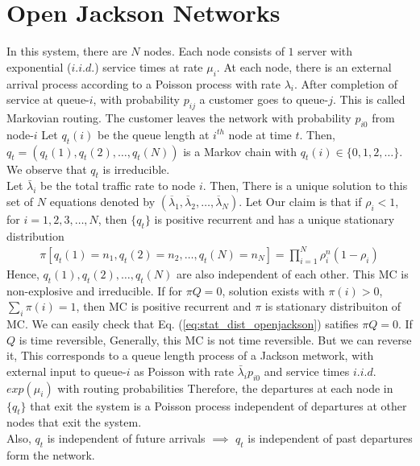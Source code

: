 \documentclass[all-lectures.tex]{subfiles}
\begin{document}
\section{Open Jackson Networks}
In this system, there are $N$ nodes. Each node consists of $1$ server with exponential ($i.i.d.$) service times at rate $\mu_i$.
 At each node, there is an external arrival process according to a Poisson process with rate $\lambda_i$. After completion of service at queue-$i$, with probability $p_{ij}$ a customer goes to queue-$j$. This is called Markovian routing. The customer leaves the network with probability $p_{i0}$ from node-$i$
Let $q_t(i)$ be the queue length at $i^{th}$ node at time $t$. Then, $q_t = (q_t(1), q_t(2), \dots , q_t(N))$ is a Markov chain with $q_t(i) \in \{0,1,2, \dots\}$. We observe that $q_t$ is irreducible. \\
\indent Let $\bar{\lambda}_i$ be the total traffic rate to node $i$. Then,
There is a unique solution to this set of $N$ equations denoted by $(\overline{\lambda}_1,\overline{\lambda}_2,\dots,\overline{\lambda}_N)$. Let
Our claim is that if $\rho_i < 1$, for $i = 1,2,3, \dots , N$, then $\{q_t\}$ is positive recurrent and has a unique stationary distribution
\begin{align}\label{eq:stat_dist_openjackson}
\pi[q_t(1)=n_1, q_t(2)=n_2, \dots , q_t(N)=n_N] = \prod_{i=1}^{N} \rho^n_i (1-\rho_i)
\end{align}
Hence, $q_t(1), q_t(2), \dots , q_t(N)$ are also independent of each other. This MC is non-explosive and irreducible.
If for $\pi Q = 0 $, solution exists with $\pi(i) >0$, $\sum_{i} \pi(i)= 1$, then MC is positive recurrent and $\pi$ is stationary distribuiton of MC. We can easily check that Eq. (\ref{eq:stat_dist_openjackson}) satifies $\pi Q = 0$.
If $Q$ is time reversible,
Generally, this MC is not time reversible. But we can reverse it,
This corresponds to a queue length process of a Jackson metwork, with external input to queue-$i$ as Poisson with rate $\bar{\lambda}_i p_{i0}$ and service times $i.i.d.$ $exp(\mu_i)$ with routing probabilities
Therefore, the departures at each node in $\{q_t\}$ that exit the system is a Poisson process independent of departures at other nodes that exit the system. \\
\indent Also, $q_t$ is independent of future arrivals $\implies$ $q_t$ is independent of past departures form the network.
\end{document}
